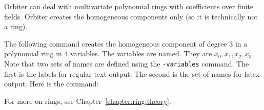 

Orbiter can deal with multivariate polynomial rings with coefficients 
over finite fields.
Orbiter creates the homogeneous components only (so it is technically not a ring).

\bigskip


The following command creates the homogeneous component of degree 3 in 
a polynomial ring in 4 variables. 
The variables are named. They are $x_0,x_1,x_2,x_3.$ 
Note that two sets of names are defined using the \verb'-variables' command. 
The first is the labels for regular text output. 
The second is the set of names for latex output.
Here is the command:



\bigskip

For more on rings, see Chapter~\ref{chapter:ring:theory}.
